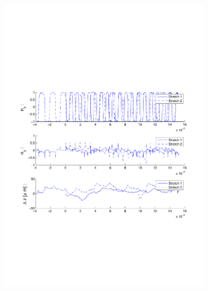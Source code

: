 \begin{figure}[H]

\centering

\includegraphics[width=0.8\textwidth]{Images/Particle 17/Stretch1.pdf}

\end{figure}

